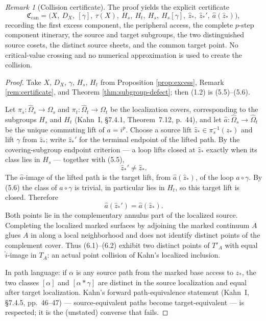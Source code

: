 \documentclass[11pt,reqno]{amsart}
\theoremstyle{definition}
\theoremstyle{remark}
\newtheorem{remark}[theorem]{Remark}
\begin{document}
\begin{remark}[Collision certificate]\label{rem:collision-certificate}
The proof yields the explicit certificate
\[
 \mathfrak C_{\mathrm{can}}=\bigl(X,\ D_X,\ [\gamma],\ \tau(X),\ H_s,\ H_t,\ H_s,\ H_s[\gamma],\ \widehat z_*,\ \widehat z_*',\ \widehat a(\widehat z_*)\bigr),  \tag{6.3}
\]
recording the first excess component, the peripheral access, the complete \(p\)-step component itinerary, the source and target subgroups, the two distinguished source cosets, the distinct source sheets, and the common target point.  No critical-value crossing and no numerical approximation is used to create the collision.
\end{remark}

\begin{proof}
Take \(X\), \(D_X\), \(\gamma\), \(H_s\), \(H_t\) from Proposition \ref{prop:excess}, Remark \ref{rem:certificate}, and Theorem \ref{thm:subgroup-defect}; then (1.2) is (5.5)--(5.6).

Let \(\pi_s\colon\widehat\Omega_s\to\Omega_s\) and \(\pi_t\colon\widehat\Omega_t\to\Omega_t\) be the localization covers, corresponding to the subgroups \(H_s\) and \(H_t\) (Kahn~I, \S7.4.1, Theorem~7.12, p.~44), and let \(\widehat a\colon\widehat\Omega_s\to\widehat\Omega_t\) be the unique commuting lift of \(a=i^p\).  Choose a source lift \(\widehat z_*\in\pi_s^{-1}(z_*)\) and lift \(\gamma\) from \(\widehat z_*\); write \(\widehat z_*'\) for the terminal endpoint of the lifted path.  By the covering-subgroup endpoint criterion --- a loop lifts closed at \(\widehat z_*\) exactly when its class lies in \(H_s\) --- together with (5.5),
\[
 \widehat z_*'\ne\widehat z_*.                        \tag{6.1}
\]
The \(\widehat a\)-image of the lifted path is the target lift, from \(\widehat a(\widehat z_*)\), of the loop \(a\circ\gamma\).  By (5.6) the class of \(a\circ\gamma\) is trivial, in particular lies in \(H_t\), so this target lift is closed.  Therefore
\[
 \widehat a(\widehat z_*')=\widehat a(\widehat z_*).  \tag{6.2}
\]
Both points lie in the complementary annulus part of the localized source.  Completing the localized marked surfaces by adjoining the marked continuum \(A\) glues \(A\) in along a local neighborhood and does not identify distinct points of the complement cover.  Thus (6.1)--(6.2) exhibit two distinct points of \(T'_A\) with equal \(\widehat i\)-image in \(T_A\): an actual point collision of Kahn's localized inclusion.

In path language: if \(\alpha\) is any source path from the marked base access to \(z_*\), the two classes \([\alpha]\) and \([\alpha*\gamma]\) are distinct in the source localization and equal after target localization.  Kahn's forward path-equivalence statement (Kahn~I, \S7.4.5, pp.~46--47) --- source-equivalent paths become target-equivalent --- is respected; it is the (unstated) converse that fails.
\end{proof}
\end{document}
